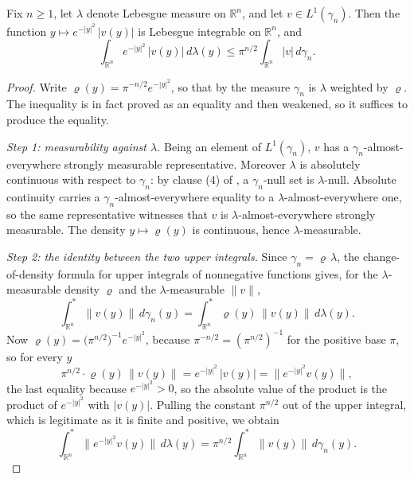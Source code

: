\begin{lemma}
Fix $n \geq 1$, let $\lambda$ denote Lebesgue measure on $\mathbb{R}^n$, and let
$v \in L^1(\gamma_n)$.  Then the function
$y \mapsto e^{-|y|^2}\,|v(y)|$ is Lebesgue integrable on $\mathbb{R}^n$, and
\[
  \int_{\mathbb{R}^n} e^{-|y|^2}\,|v(y)|\,d\lambda(y)
    \leq \pi^{n/2}\int_{\mathbb{R}^n} |v|\,d\gamma_n .
\]
\end{lemma}
\begin{proof}
Write $\varrho(y) = \pi^{-n/2}e^{-|y|^2}$, so that by  the
measure $\gamma_n$ is $\lambda$ weighted by $\varrho$.  The inequality is in fact
proved as an equality and then weakened, so it suffices to produce the equality.

\emph{Step 1: measurability against $\lambda$.}
Being an element of $L^1(\gamma_n)$, $v$ has a $\gamma_n$-almost-everywhere
strongly measurable representative.  Moreover $\lambda$ is absolutely continuous
with respect to $\gamma_n$: by clause (4) of ,
a $\gamma_n$-null set is $\lambda$-null.  Absolute continuity carries a
$\gamma_n$-almost-everywhere equality to a $\lambda$-almost-everywhere one, so
the same representative witnesses that $v$ is $\lambda$-almost-everywhere
strongly measurable.  The density $y \mapsto \varrho(y)$ is continuous, hence
$\lambda$-measurable.

\emph{Step 2: the identity between the two upper integrals.}
Since $\gamma_n = \varrho\,\lambda$, the change-of-density formula for upper
integrals of nonnegative functions gives, for the $\lambda$-measurable density
$\varrho$ and the $\lambda$-measurable $\|v\|$,
\[
  \int^*_{\mathbb{R}^n} \|v(y)\|\,d\gamma_n(y)
    = \int^*_{\mathbb{R}^n} \varrho(y)\,\|v(y)\|\,d\lambda(y) .
\]
Now $\varrho(y) = \bigl(\pi^{n/2}\bigr)^{-1}e^{-|y|^2}$, because
$\pi^{-n/2} = (\pi^{n/2})^{-1}$ for the positive base $\pi$, so for every $y$
\[
  \pi^{n/2}\cdot\varrho(y)\,\|v(y)\| = e^{-|y|^2}\,|v(y)|
    = \bigl\|e^{-|y|^2}v(y)\bigr\| ,
\]
the last equality because $e^{-|y|^2} > 0$, so the absolute value of the product
is the product of $e^{-|y|^2}$ with $|v(y)|$.  Pulling the constant
$\pi^{n/2}$ out of the upper integral, which is legitimate as it is finite and
positive, we obtain
\begin{equation*}
  \int^*_{\mathbb{R}^n}\bigl\|e^{-|y|^2}v(y)\bigr\|\,d\lambda(y)
    = \pi^{n/2}\int^*_{\mathbb{R}^n}\|v(y)\|\,d\gamma_n(y) . \tag{1}
\end{equation*}


\end{proof}
